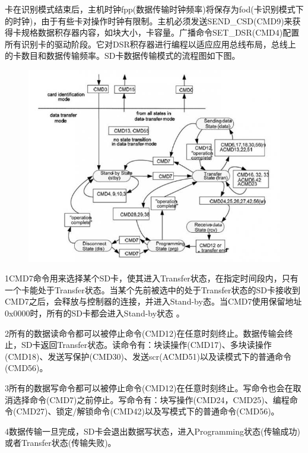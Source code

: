 卡在识别模式结束后，主机时钟fpp(数据传输时钟频率)将保存为fod(卡识别模式下的时钟)，由于有些卡对操作时钟有限制。主机必须发送SEND_CSD(CMD9)来获得卡规格数据积存器内容，如块大小，卡容量。广播命令SET_DSR(CMD4)配置所有识别卡的驱动阶段。它对DSR积存器进行编程以适应应用总线布局，总线上的卡数目和数据传输频率。SD卡数据传输模式的流程图如下图。
\begin{figure}[H]
    \centering
    \includegraphics{figures/06-02-数据传输.png}
\end{figure}

1CMD7命令用来选择某个SD卡，使其进入Transfer状态，在指定时间段内，只有一个卡能处于Transfer状态。当某个先前被选中的处于Transfer状态的SD卡接收到CMD7之后，会释放与控制器的连接，并进入Stand-by态。当CMD7使用保留地址0x0000时，所有的SD卡都会进入Stand-by状态 。


2所有的数据读命令都可以被停止命令(CMD12)在任意时刻终止。数据传输会终止，SD卡返回Transfer状态。读命令有：块读操作(CMD17)、多块读操作(CMD18)、发送写保护(CMD30)、发送scr(ACMD51)以及读模式下的普通命令(CMD56)。

3所有的数据写命令都可以被停止命令(CMD12)在任意时刻终止。写命令也会在取消选择命令(CMD7)之前停止。写命令有：块写操作(CMD24，CMD25)、编程命令(CMD27)、锁定/解锁命令(CMD42)以及写模式下的普通命令(CMD56)。

4数据传输一旦完成，SD卡会退出数据写状态，进入Programming状态(传输成功)或者Transfer状态(传输失败)。
